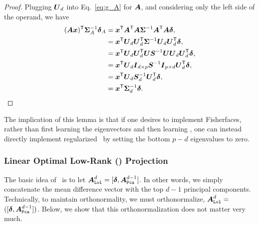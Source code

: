 \documentclass[10pt]{article}
\begin{document}
\begin{proof}
Plugging $\bU_d$ into Eq.~\eqref{eq:g_A} for $\bA$, and considering only the left side of the operand, we have
\begin{align*}
(\bA \bx)\T \bSig^{-1}_A \bdel_A &= \bx\T \bA\T \bA \bSig^{-1} \bA\T \bA \bdel,
\\&= \bx\T  \bU_d\bU_d\T \bSig^{-1} \bU_d\bU_d\T \bdel,
\\&= \bx\T  \bU_d \bU_d\T \bU \bS^{-1} \bU \bU_d\bU_d\T \bdel,
\\&= \bx\T  \bU_d \bI_{d \times p} \bS^{-1} \bI_{p \times d} \bU_d\T \bdel,
\\&= \bx\T  \bU_d \bS^{-1}_d  \bU_d\T \bdel ,
\\&= \bx\T  \bSig^{-1}_d  \bdel.
\end{align*}
\end{proof}

The implication of this lemma is that if one desires to implement Fisherfaces, rather than first learning the eigenvectors and then learning \Lda, one can instead directly implement regularized \Lda~by setting the bottom $p-d$ eigenvalues to zero.




\subsubsection{Linear Optimal Low-Rank (\Lol) Projection}


The basic idea of \Lol~is to let $\bA_{\Lol}^d=[\bdel, \bA_{\Pca}^{d-1}]$.  In other words, we simply concatenate the mean difference vector with the top $d-1$ principal components.  
Technically, to maintain orthonormality, we must orthonormalize, $\bA_{\Lol}^d=$ $([\bdel, \bA_{\Pca}^{d-1}])$.  Below, we show that this orthonormalization does not matter very much.



\end{document}
